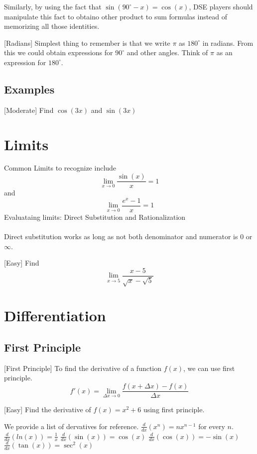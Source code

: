 \documentclass[a4paper]{article}
\begin{document}
Similarly, by using the fact that $\sin(90^\circ-x)=\cos(x)$, DSE players should manipulate this fact to obtaino other product to sum formulas instead of memorizing all those identities. 

\begin{defn}{}{}[Radians] Simplest thing to remember is that we write $\pi$ as $180^\circ$ in radians. From this we could obtain expressions for $90^\circ$ and other angles. Think of $\pi$ as an expression for $180^\circ$. 
\end{defn}

\subsection{Examples}
\begin{eg}{}{}[Moderate] Find $\cos(3x)$ and $\sin(3x)$
\end{eg}

\pagebreak
\section{Limits}
Common Limits to recognize include $$\lim_{x\to 0}\frac{\sin(x)}{x}=1$$ and $$\lim_{x\to 0}\frac{e^x-1}{x}=1$$
Evaluataing limits: Direct Substitution and Rationalization\\~\\
Direct substitution works as long as not both denominator and numerator is $0$ or $\infty$. 
\begin{eg}{[Easy]}{} Find $$\lim_{x\to 5}\frac{x-5}{\sqrt{x}-\sqrt{5}}$$
\end{eg}

\pagebreak
\section{Differentiation}
\subsection{First Principle}
\begin{defn}{[First Principle]}{} To find the derivative of a function $f(x)$, we can use first principle. $$f'(x)=\lim_{\Delta x\to0}\frac{f(x+\Delta x)-f(x)}{\Delta x}$$
\end{defn}

\begin{eg}{[Easy]}{} Find the derivative of $f(x)=x^2+6$ using first principle. 
\end{eg}

We provide a list of dervatives for reference. \linebreak
$\frac{d}{dx}(x^n)=nx^{n-1}$ for every $n$. \linebreak
$\frac{d}{dx}(ln(x))=\frac{1}{x}$\linebreak
$\frac{d}{dx}(\sin(x))=\cos(x)$\linebreak
$\frac{d}{dx}(\cos(x))=-\sin(x)$\linebreak
$\frac{d}{dx}(\tan(x))=\sec^2(x)$\linebreak
\end{document}
